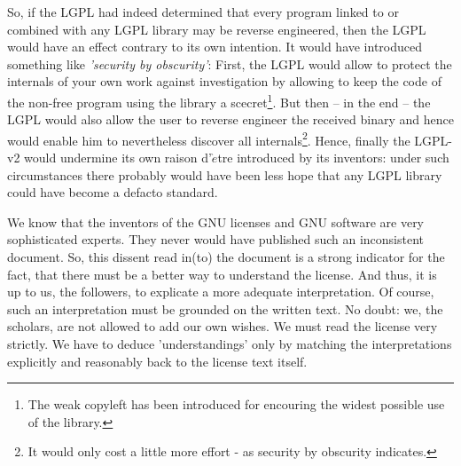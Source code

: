 So, if the LGPL had indeed determined that every program linked to or combined
with any LGPL library may be reverse engineered, then the LGPL would have an
effect contrary to its own intention. It would have introduced something like
\emph{'security by obscurity'}: First, the LGPL would allow to protect the
internals of your own work against investigation by allowing to keep the code of
the non-free program using the library a scecret\footnote{The weak copyleft has
been introduced for encouring the widest possible use of the library.}. But then
-- in the end -- the LGPL would also allow the user to reverse engineer the
received binary and hence would enable him to nevertheless discover all
internals\footnote{It would only cost a little more effort - as security by
obscurity indicates.}. Hence, finally the LGPL-v2 would undermine its own
raison d'$\grave{e}$tre introduced by its inventors: under such circumstances
there probably would have been less hope that any LGPL library could have become
a defacto standard.

We know that the inventors of the GNU licenses and GNU software are very
sophisticated experts. They never would have published such an inconsistent
document. So, this dissent read in(to) the document is a strong indicator for
the fact, that there must be a better way to understand the license. And thus,
it is up to us, the followers, to explicate a more adequate interpretation. Of
course, such an interpretation must be grounded on the written text. No doubt:
we, the scholars, are not allowed to add our own wishes. We must read the
license very strictly. We have to deduce 'understandings' only by matching the
interpretations explicitly and reasonably back to the license text itself.

